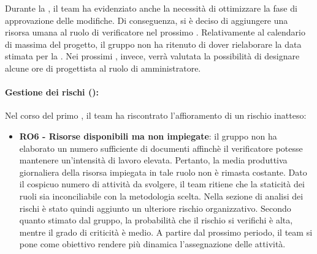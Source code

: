 \vspace{0.5\baselineskip}
\par Durante la , il team ha evidenziato anche la necessità di ottimizzare la fase di approvazione delle modifiche. Di conseguenza, si è deciso di aggiungere una risorsa umana al ruolo di verificatore nel prossimo . Relativamente al calendario di massima del progetto, il gruppo non ha ritenuto di dover rielaborare la data stimata per la . Nei prossimi , invece, verrà valutata la possibilità di designare alcune ore di progettista al ruolo di amministratore.

\paragraph*{Gestione dei rischi ():}
\par Nel corso del primo , il team ha riscontrato l'affioramento di un rischio inatteso:
\begin{itemize}
  \item \textbf{RO6 - Risorse disponibili ma non impiegate}: il gruppo non ha elaborato un numero sufficiente di documenti affinchè il verificatore potesse mantenere un'intensità di lavoro elevata. Pertanto, la media produttiva giornaliera della risorsa impiegata in tale ruolo non è rimasta costante. Dato il cospicuo numero di attività da svolgere, il team ritiene che la staticità dei ruoli sia inconciliabile con la metodologia scelta. Nella sezione di analisi dei rischi è stato quindi aggiunto un ulteriore rischio organizzativo. Secondo quanto stimato dal gruppo, la probabilità che il rischio si verifichi è alta, mentre il grado di criticità è medio. A partire dal prossimo periodo, il team si pone come obiettivo rendere più dinamica l'assegnazione delle attività.
\end{itemize}

